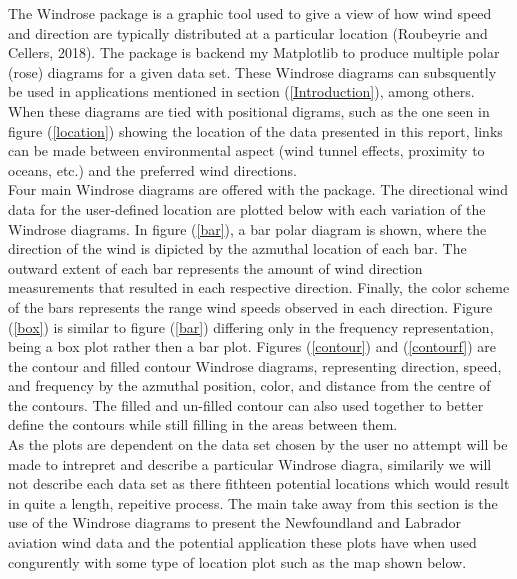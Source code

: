 \documentclass{article}
\begin{document}
The Windrose package is a graphic tool used to give a view of how wind speed and direction are typically distributed at a particular location (Roubeyrie and Cellers, 2018). The package is backend my 
Matplotlib to produce multiple polar (rose) diagrams for a given data set. These Windrose diagrams can subsquently be used in applications mentioned in section (\ref{Introduction}), among others. When 
these diagrams are tied with positional digrams, such as the one seen in figure (\ref{location}) showing the location of the data presented in this report, links can be made between environmental aspect 
(wind tunnel effects, proximity to oceans, etc.) and the preferred wind directions.
\\
\indent Four main Windrose diagrams are offered with the package. The directional wind data for the user-defined location are plotted below with each variation of the Windrose diagrams. In figure 
(\ref{bar}), a bar polar diagram is shown, where the direction of the wind is dipicted by the azmuthal location of each bar. The outward extent of each bar represents the amount of wind direction 
measurements that resulted in each respective direction. Finally, the color scheme of the bars represents the range wind speeds observed in each direction. Figure (\ref{box}) is similar to figure 
(\ref{bar}) differing only in the frequency representation, being a box plot rather then a bar plot. Figures (\ref{contour}) and (\ref{contourf}) are the contour and filled contour Windrose diagrams, 
representing direction, speed, and frequency by the azmuthal position, color, and distance from the centre of the contours. The filled and un-filled contour can also used together to better define the 
contours while still filling in the areas between them.
\\
\indent As the plots are dependent on the data set chosen by the user no attempt will be made to intrepret and describe a particular Windrose diagra, similarily we will not describe each data set as 
there fithteen potential locations which would result in quite a length, repeitive process. The main take away from this section is the use of the Windrose diagrams to present the Newfoundland and 
Labrador aviation wind data and the potential application these plots have when used congurently with some type of location plot such as the map shown below.
 
\end{document}
